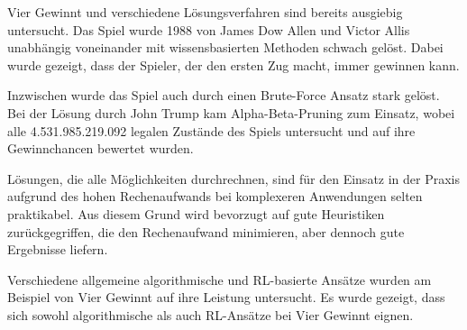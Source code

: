 Vier Gewinnt und verschiedene Lösungsverfahren sind bereits ausgiebig untersucht. Das Spiel wurde 1988 von James Dow Allen und Victor Allis unabhängig voneinander mit wissensbasierten Methoden schwach gelöst. Dabei wurde gezeigt, dass der Spieler, der den ersten Zug macht, immer gewinnen kann\cite{Allen.2010}\cite{Allis.1988}.

Inzwischen wurde das Spiel auch durch einen Brute-Force Ansatz stark gelöst. Bei der Lösung durch John Trump kam Alpha-Beta-Pruning zum Einsatz, wobei alle 4.531.985.219.092 legalen Zustände des Spiels untersucht und auf ihre Gewinnchancen bewertet wurden\cite{Tromp}.

Lösungen, die alle Möglichkeiten durchrechnen, sind für den Einsatz in der Praxis aufgrund des hohen Rechenaufwands bei komplexeren Anwendungen selten praktikabel. Aus diesem Grund wird bevorzugt auf gute Heuristiken zurückgegriffen, die den Rechenaufwand minimieren, aber dennoch gute Ergebnisse liefern\cite{Heineman.October2008}.

Verschiedene allgemeine algorithmische und RL-basierte Ansätze wurden am Beispiel von Vier Gewinnt auf ihre Leistung untersucht. Es wurde gezeigt, dass sich sowohl algorithmische als auch RL-Ansätze bei Vier Gewinnt eignen\cite{Alderton.2019}\cite{Thill.2012}\cite{Wäldchen.2022}\cite{Taylor.2024}\cite{Sheoran.2022}\cite{Qiu.2022}.
